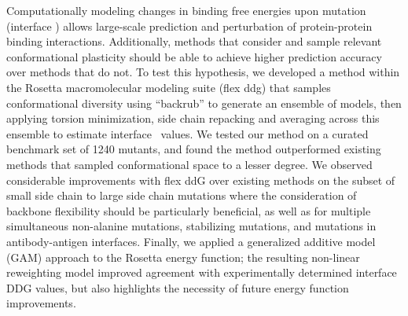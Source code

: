 Computationally modeling changes in binding free energies upon mutation (interface \ddg) allows large-scale prediction and perturbation of protein-protein binding interactions.
Additionally, methods that consider and sample relevant conformational plasticity should be able to achieve higher prediction accuracy over methods that do not.
To test this hypothesis, we developed a method within the Rosetta macromolecular modeling suite (flex ddg) that samples conformational diversity using ``backrub'' to generate an ensemble of models, then applying torsion minimization, side chain repacking and averaging across this ensemble to estimate interface \ddg\ values.
We tested our method on a curated benchmark set of 1240 mutants, and found the method outperformed existing methods that sampled conformational space to a lesser degree.
We observed considerable improvements with flex ddG over existing methods on the subset of small side chain to large side chain mutations where the consideration of backbone flexibility should be particularly beneficial, as well as for multiple simultaneous non-alanine mutations, stabilizing mutations, and mutations in antibody-antigen interfaces.
Finally, we applied a generalized additive model (GAM) approach to the Rosetta energy function; the resulting non-linear reweighting model improved agreement with experimentally determined interface DDG values, but also highlights the necessity of future energy function improvements.